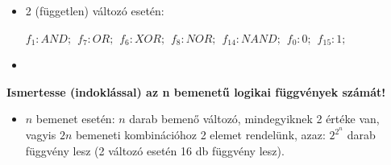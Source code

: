 \documentclass[11pt,a4paper]{article}
\begin{document}
            \begin{tcolorbox}[colback=blue!5!white,colframe=blue!50!black,title= 6. Ismertesse a 2 bemenetű logikai függvényeket! Ezek közül néhányat nevezzen is el!]
                \begin{itemize}
                    \item 2 (független) változó esetén:
                    \begin{center}
                    \end{center}
                    \(f_1: AND;\hspace{5pt}f_7: OR;\hspace{5pt}f_6: XOR;\hspace{5pt}f_8: NOR;\hspace{5pt}f_{14}: NAND;\hspace{5pt}f_0: 0;\hspace{5pt}f_{15}: 1;\)
                    \item 
                \end{itemize}
                \textbf{Ismertesse (indoklással) az n bemenetű logikai függvények számát!}
                \begin{itemize}
                    \item \(n\) bemenet esetén: \(n\) darab bemenő változó, mindegyiknek 2 értéke van, vagyis
                    \(2n\) bemeneti kombinációhoz 2 elemet rendelünk, azaz: \(2^{2^n} \) darab függvény lesz (2 változó esetén 16 db függvény lesz).
                \end{itemize}
            \end{tcolorbox}
\end{document}
